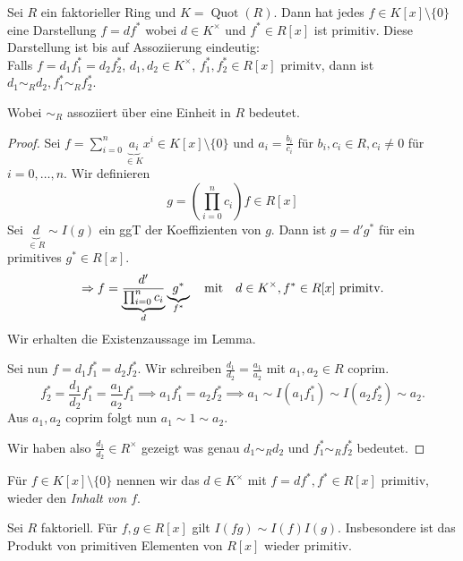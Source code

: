 \begin{lemma}
	Sei $R$ ein faktorieller Ring und $K = \operatorname{Quot}(R)$.
	Dann hat jedes  $f \in K[x] \setminus \{0\} $ eine Darstellung $f = d f^{*}$ 
	wobei $d \in K^{\times}$ und $f^{*} \in R[x]$ ist primitiv.
	Diese Darstellung ist bis auf Assoziierung eindeutig:\\
	Falls $f = d_1 f_1^{*} = d_2 f_2^{*}$, $d_1,d_2 \in K^{\times}$,
	$f_1^{*},f_2^{*} \in R[x]$ primitv, dann ist $d_1 \sim_{R} d_2, f_1^{*} \sim_{R} f_2^{*}$.
	
	Wobei $\sim_{R}$  assoziiert über eine Einheit in $R$ bedeutet.
\end{lemma}

\begin{proof}
	Sei $f = \sum_{i=0}^{n} \underbrace{a_{i}}_{\in K} x^{i} \in K[x] \setminus \{0\} $ und $a_{i} = \frac{b_{i}}{c_{i}}$ für $b_{i},c_{i} \in R, c_{i} \neq 0$ für $i = 0,\ldots,n$.
	Wir definieren 
	 \[
		 g = \left( \prod_{i=0}^{n} c_{i} \right) f \in R[x]
	\] 
	Sei $\underbrace{d}_{\in R} \sim I(g)$ ein ggT der Koeffizienten von $g$.
	Dann ist $g = d' g^{*}$ für ein primitives $g^{*} \in R[x]$.
	\[
		\implies f = \underbrace{\frac{d'}{\prod_{i=0}^{n} c_{i}}}_{d} \underbrace{g^{*}}_{f^{*}} \qq{mit} d \in K^{\times }, f^{*} \in R[x] \text{ primitv}
	.\] 
	Wir erhalten die Existenzaussage im Lemma.

	Sei nun $f = d_1 f_1^{*} = d_2 f_2^{*}$.
	Wir schreiben $\frac{d_1}{d_2} = \frac{a_1}{a_2}$ mit $a_1,a_2 \in R$ coprim.
	\[
		f_2^{*} = \frac{d_1}{d_2} f_1^{*} = \frac{a_1}{a_2} f_1^{*} \implies a_1 f_1^{*} = a_2 f_2^{*} \implies a_1 \sim I(a_1 f_1^{*}) \sim I(a_2 f_2^{*}) \sim a_2
	.\]
	Aus $a_1,a_2$ coprim folgt nun $a_1 \sim 1 \sim a_2$.

	Wir haben also $\frac{d_1}{d_2} \in R^{\times}$ gezeigt was genau $d_1 \sim_{R} d_2$ und $f_1^{*} \sim_{R} f_2^{*}$ bedeutet.
\end{proof}

\begin{definition}
	Für $f \in K[x] \setminus \{0\} $ nennen wir das $d \in K^{\times}$ mit $f = d f^{*}, f^{*} \in R[x]$ primitiv, wieder den \emph{Inhalt von $f$}.
\end{definition}

\begin{proposition}[Gauss]
	Sei $R$ faktoriell. Für $f,g \in R[x]$ gilt $I(fg) \sim I(f) I(g)$.
	Insbesondere ist das Produkt von primitiven Elementen von $R[x]$ wieder primitiv.
\end{proposition}

